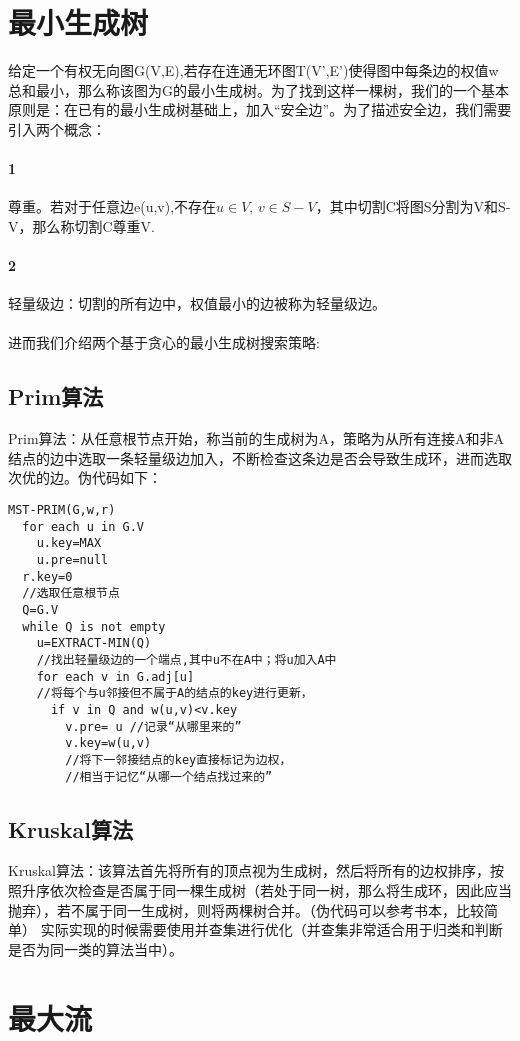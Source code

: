 \documentclass[12pt,a4paper,UTF16]{ctexbook}
\theoremstyle{plain}
\begin{document}
\section{最小生成树}
给定一个有权无向图G(V,E),若存在连通无环图T(V',E')使得图中每条边的权值w总和最小，那么称该图为G的最小生成树。为了找到这样一棵树，我们的一个基本原则是：在已有的最小生成树基础上，加入“安全边”。为了描述安全边，我们需要引入两个概念：
\paragraph{1}尊重。若对于任意边e(u,v),不存在$u\in V$, $v\in S-V$，其中切割C将图S分割为V和S-V，那么称切割C尊重V.
\paragraph{2}轻量级边：切割的所有边中，权值最小的边被称为轻量级边。
\paragraph{}进而我们介绍两个基于贪心的最小生成树搜索策略:
\subsection{Prim算法}
Prim算法：从任意根节点开始，称当前的生成树为A，策略为从所有连接A和非A结点的边中选取一条轻量级边加入，不断检查这条边是否会导致生成环，进而选取次优的边。伪代码如下：
\begin{lstlisting}[basicstyle=\ttfamily]
  MST-PRIM(G,w,r)
  for each u in G.V
    u.key=MAX
    u.pre=null
  r.key=0 
  //选取任意根节点
  Q=G.V
  while Q is not empty
    u=EXTRACT-MIN(Q) 
    //找出轻量级边的一个端点,其中u不在A中；将u加入A中
    for each v in G.adj[u]
    //将每个与u邻接但不属于A的结点的key进行更新，
      if v in Q and w(u,v)<v.key
        v.pre= u //记录“从哪里来的”
        v.key=w(u,v)
        //将下一邻接结点的key直接标记为边权，
        //相当于记忆“从哪一个结点找过来的” 
\end{lstlisting}
\subsection{Kruskal算法}
Kruskal算法：该算法首先将所有的顶点视为生成树，然后将所有的边权排序，按照升序依次检查是否属于同一棵生成树（若处于同一树，那么将生成环，因此应当抛弃），若不属于同一生成树，则将两棵树合并。（伪代码可以参考书本，比较简单）
实际实现的时候需要使用并查集进行优化（并查集非常适合用于归类和判断是否为同一类的算法当中）。
\section{最大流}
\end{document}
